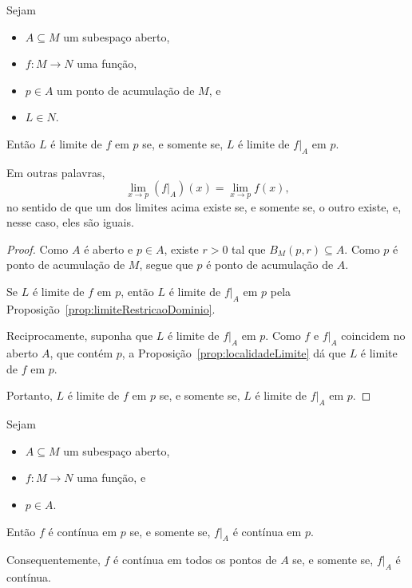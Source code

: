 \begin{proposition}\label{prop:limiteRestricaoAberto}
    Sejam
    \begin{itemize}
        \item $A\subseteq M$ um subespaço aberto,
        \item $f: M\to N$ uma função,
        \item $p\in A$ um ponto de acumulação de $M$, e
        \item $L\in N$.
    \end{itemize}

    Então $L$ é limite de $f$ em $p$ se, e somente se, $L$ é limite de $f|_A$ em $p$.

    Em outras palavras,
    \[
        \lim_{x\to p} (f|_A)(x)=\lim_{x\to p} f(x),
    \]
    no sentido de que um dos limites acima existe se, e somente se, o outro existe, e, nesse caso, eles são iguais.
\end{proposition}

\begin{proof}
    Como $A$ é aberto e $p\in A$, existe $r>0$ tal que $B_M(p,r)\subseteq A$.
    Como $p$ é ponto de acumulação de $M$, segue que $p$ é ponto de acumulação de $A$.

    Se $L$ é limite de $f$ em $p$, então $L$ é limite de $f|_A$ em $p$ pela Proposição~\ref{prop:limiteRestricaoDominio}.

    Reciprocamente, suponha que $L$ é limite de $f|_A$ em $p$.
    Como $f$ e $f|_A$ coincidem no aberto $A$, que contém $p$, a Proposição~\ref{prop:localidadeLimite} dá que $L$ é limite de $f$ em $p$.

    Portanto, $L$ é limite de $f$ em $p$ se, e somente se, $L$ é limite de $f|_A$ em $p$.
\end{proof}

\begin{corollary}\label{cor:continuidadeRestricaoAberto}
    Sejam
    \begin{itemize}
        \item $A\subseteq M$ um subespaço aberto,
        \item $f: M\to N$ uma função, e
        \item $p\in A$.
    \end{itemize}

    Então $f$ é contínua em $p$ se, e somente se, $f|_A$ é contínua em $p$.

    Consequentemente, $f$ é contínua em todos os pontos de $A$ se, e somente se, $f|_A$ é contínua.
\end{corollary}

